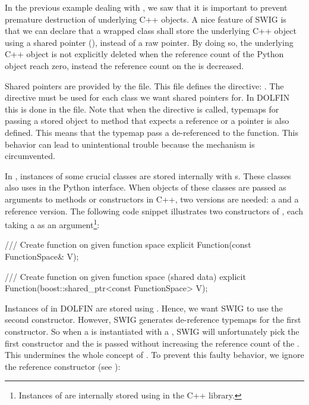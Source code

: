 
In the previous example dealing with , we saw that
it is important to prevent premature destruction of underlying C++
objects. A nice feature of SWIG is that we can declare that a wrapped
class shall store the underlying C++ object using a shared pointer
(), instead of a raw pointer. By doing so, the
underlying C++ object is not explicitly deleted when the reference
count of the Python object reach zero, instead the reference count on
the  is decreased.

Shared pointers are provided by the  file.
This file defines the directive: . The directive
must be used for each class we want shared pointers for. In DOLFIN
this is done in the  file. Note that when
the  directive is called, typemaps for passing a
 stored object to method that expects a reference or
a pointer is also defined. This means that the typemap pass a
de-referenced  to the function. This behavior can
lead to unintentional trouble because the  mechanism
is circumvented.

In \dolfin, instances of some crucial classes are stored internally
with s. These classes also uses 
in the Python interface. When objects of these classes are passed
as arguments to methods or constructors in C++, two versions are
needed: a  and a reference version. The following
code snippet illustrates two constructors of , each
taking a  as an argument\footnote{Instances of
 are internally stored using  in
the \dolfin C++ library.}:
\pagebreak
\begin{c++}
/// Create function on given function space
explicit Function(const FunctionSpace& V);

/// Create function on given function space (shared data)
explicit Function(boost::shared_ptr<const FunctionSpace> V);
\end{c++}
Instances of  in DOLFIN are stored
using . Hence, we want SWIG to use the second
constructor. However, SWIG generates de-reference typemaps for the
first constructor. So when a  is instantiated with a
, SWIG will unfortunately pick the first constructor
and the  is passed without increasing the reference
count of the .  This undermines the whole concept
of . To prevent this faulty behavior, we ignore the
reference constructor (see ):
\begin{swigcode}
\end{swigcode}

